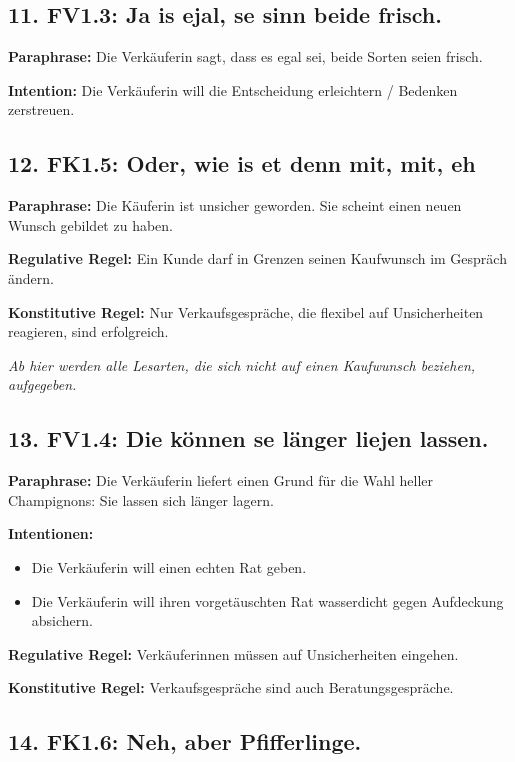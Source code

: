 \documentclass[11pt]{article}
\begin{document}
\subsection*{11. FV1.3: Ja is ejal, se sinn beide frisch.}

\textbf{Paraphrase:} Die Verkäuferin sagt, dass es egal sei, beide Sorten seien frisch.

\textbf{Intention:} Die Verkäuferin will die Entscheidung erleichtern / Bedenken zerstreuen.

\subsection*{12. FK1.5: Oder, wie is et denn mit, mit, eh}

\textbf{Paraphrase:} Die Käuferin ist unsicher geworden. Sie scheint einen neuen Wunsch gebildet zu haben.

\textbf{Regulative Regel:} Ein Kunde darf in Grenzen seinen Kaufwunsch im Gespräch ändern.

\textbf{Konstitutive Regel:} Nur Verkaufsgespräche, die flexibel auf Unsicherheiten reagieren, sind erfolgreich.

\emph{Ab hier werden alle Lesarten, die sich nicht auf einen Kaufwunsch beziehen, aufgegeben.}

\subsection*{13. FV1.4: Die können se länger liejen lassen.}

\textbf{Paraphrase:} Die Verkäuferin liefert einen Grund für die Wahl heller Champignons: Sie lassen sich länger lagern.

\textbf{Intentionen:}
\begin{itemize}
    \item Die Verkäuferin will einen echten Rat geben.
    \item Die Verkäuferin will ihren vorgetäuschten Rat wasserdicht gegen Aufdeckung absichern.
\end{itemize}

\textbf{Regulative Regel:} Verkäuferinnen müssen auf Unsicherheiten eingehen.

\textbf{Konstitutive Regel:} Verkaufsgespräche sind auch Beratungsgespräche.

\subsection*{14. FK1.6: Neh, aber Pfifferlinge.}
\end{document}
